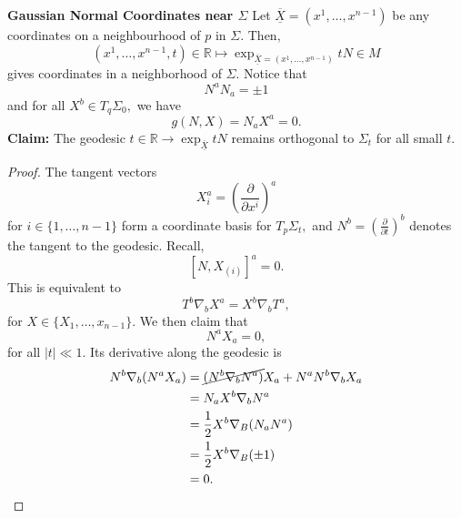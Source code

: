 \documentclass{article}
\numberwithin{equation}{section}
\begin{document}
\textbf{Gaussian Normal Coordinates near $\Sigma$}
Let $\underline{\overline{X}} = (x^1,\dots,x^{n-1})$ be any coordinates on a neighbourhood of $p$ in $\Sigma.$ Then,
\begin{equation*}
    (x^1,\dots,x^{n-1},t) \in \mathbb{R} \mapsto \exp_{\underline{\overline{X}}= (x^1,\dots,x^{n-1})}tN \in M
\end{equation*}
gives coordinates in a neighborhood of $\Sigma.$ Notice that 
\begin{equation*}
    N^aN_a = \pm 1
\end{equation*}
and for all $X^b\in T_q\Sigma_0,$ we have
\begin{equation*}
    g(N,X) = N_aX^a = 0.
\end{equation*}
\textbf{Claim:} The geodesic $t\in \mathbb{R} \to \exp_{\underline{\overline{X}}}tN$ remains orthogonal to $\Sigma_t$ for all small $t.$
\begin{proof}
    The tangent vectors 
    \begin{equation*}
        X_i^a = \left(\frac{\partial}{\partial x^i}\right)^a
    \end{equation*}
    for $i\in \{1,\dots,n-1\}$ form a coordinate basis for $T_p\Sigma_t,$ and $N^b = \left(\frac{\partial}{\partial t}\right)^b$ denotes the tangent to the geodesic. Recall,
    \begin{equation*}
        \left[N, X_{(i)}\right]^a = 0.
    \end{equation*}
    This is equivalent to 
    \begin{equation*}
        T^b\nabla_bX^a = X^b\nabla_bT^a,
    \end{equation*}
    for $X\in \{X_1,\dots,x_{n-1}\}.$ We then claim that
    \begin{equation*}
        N^aX_a = 0,
    \end{equation*}
    for all $|t| \ll 1.$ Its derivative along the geodesic is 
    \begin{align*}
        N^b\nabla_b(N^aX_a) &= \cancel{(N^b\nabla_bN^a)}X_a + N^aN^b\nabla_b X_a \\ 
        &= N_aX^b\nabla_bN^a \\ 
        &= \frac{1}{2}X^b\nabla_B(N_aN^a) \\ 
        &= \frac{1}{2}X^b\nabla_B(\pm 1) \\ 
        &= 0.
    \end{align*}
\end{proof}
\end{document}
